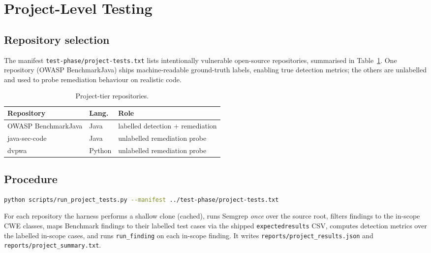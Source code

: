 \documentclass[11pt,a4paper]{article}
\newcommand{\code}[1]{\texttt{\small #1}}
\begin{document}
\section{Project-Level Testing}
\label{sec:project}

\subsection{Repository selection}
The manifest \code{test-phase/project-tests.txt} lists intentionally
vulnerable open-source repositories, summarised in
Table~\ref{tab:repos}. One repository (OWASP BenchmarkJava) ships
machine-readable ground-truth labels, enabling true detection metrics;
the others are unlabelled and used to probe remediation behaviour on
realistic code.

\begin{table}[h]
\centering
\caption{Project-tier repositories.}
\label{tab:repos}
\begin{tabular}{@{}lll@{}}
\toprule
\textbf{Repository} & \textbf{Lang.} & \textbf{Role} \\
\midrule
OWASP BenchmarkJava & Java   & labelled detection + remediation \\
java-sec-code       & Java   & unlabelled remediation probe \\
dvpwa               & Python & unlabelled remediation probe \\
\bottomrule
\end{tabular}
\end{table}

\subsection{Procedure}
\begin{lstlisting}[language=bash]
python scripts/run_project_tests.py --manifest ../test-phase/project-tests.txt
\end{lstlisting}
For each repository the harness performs a shallow clone (cached), runs
Semgrep \emph{once} over the source root, filters findings to the in-scope
CWE classes, maps Benchmark findings to their labelled test cases via the
shipped \code{expectedresults} CSV, computes detection metrics over the
labelled in-scope cases, and runs \code{run\_finding} on each in-scope
finding. It writes \code{reports/project\_results.json} and
\code{reports/project\_summary.txt}.
\end{document}
